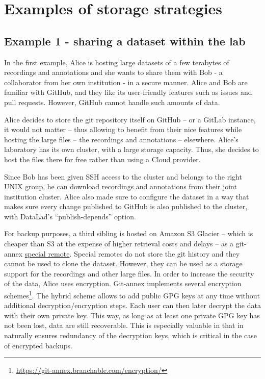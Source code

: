 \documentclass[smallextended]{svjour3}       %
\begin{document}
\appendix

\section{Examples of storage strategies}\label{appendix:examples}

\subsection{\label{sec:example1}Example 1 - sharing a dataset within the lab}

In the first example, Alice is hosting large datasets of a few terabytes of recordings and annotations and she wants to share them with Bob - a collaborator from her own institution - in a secure manner. Alice and Bob are familiar with GitHub, and they like its user-friendly features such as issues and pull requests. However, GitHub cannot handle such amounts of data.

Alice decides to store the git repository itself on GitHub -- or a GitLab instance, it would not matter -- thus allowing to benefit from their nice features while hosting the large files -- the recordings and annotations -- elsewhere. Alice's laboratory has its own cluster, with a large storage capacity. Thus, she decides to host the files there for free rather than using a Cloud provider.

Since Bob has been given SSH access to the cluster and belongs to the right UNIX group, he can download recordings and annotations from their joint institution cluster. Alice also made sure to configure the dataset in a way that makes sure every change published to GitHub is also published to the cluster, with DataLad's ``publish-depends'' option. 

For backup purposes, a third sibling is hosted on Amazon S3 Glacier -- which is cheaper than S3 at the expense of higher retrieval costs and delays -- as a git-annex \href{https://git-annex.branchable.com/special_remotes/}{special remote}. Special remotes do not store the git history and they cannot be used to clone the dataset. However, they can be used as a storage support for the recordings and other large files. In order to increase the security of the data, Alice uses encryption. Git-annex implements several encryption schemes\footnote{\url{https://git-annex.branchable.com/encryption/}}. The hybrid scheme allows to add public GPG keys at any time without additional decryption/encryption steps. Each user can then later decrypt the data with their own private key. This way, as long as at least one private GPG key has not been lost, data are still recoverable. This is especially valuable in that in naturally ensures redundancy of the decryption keys, which is critical in the case of encrypted backups.
\end{document}
